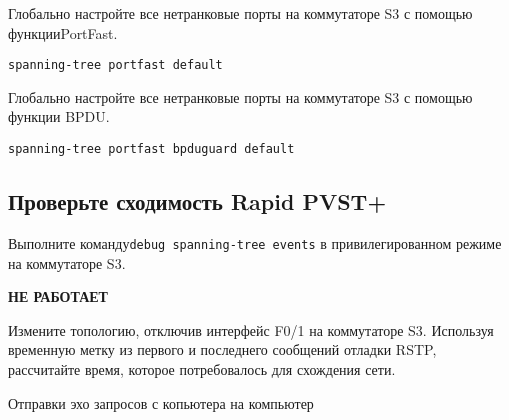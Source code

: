 Глобально настройте все нетранковые порты
на коммутаторе S3 с помощью функцииPortFast.

\begin{verbatim}
spanning-tree portfast default
\end{verbatim}

Глобально настройте все нетранковые порты
на коммутаторе S3 с помощью функции BPDU.

\begin{verbatim}
spanning-tree portfast bpduguard default
\end{verbatim}

\subsection{Проверьте сходимость Rapid PVST+}

Выполните команду\texttt{debug spanning-tree events} 
в привилегированном режиме на коммутаторе S3.

\textbf{НЕ РАБОТАЕТ}

Измените топологию, отключив интерфейс F0/1 на коммутаторе S3.
Используя временную метку из первого и последнего сообщений отладки RSTP,
рассчитайте время, которое потребовалось для схождения сети.

\begin{image}
	\caption{Отправки эхо запросов с копьютера на компьютер}
\end{image}


